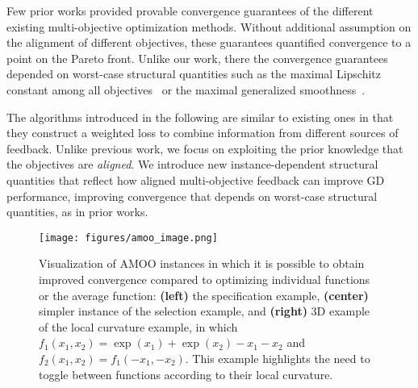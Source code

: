 Few prior works provided provable convergence guarantees of the different existing multi-objective optimization methods. Without additional assumption on the alignment of different objectives, these guarantees quantified convergence to a point on the Pareto front. Unlike our work, there the convergence guarantees depended on worst-case structural quantities such as the maximal Lipschitz constant among all objectives~\cite{liu2021conflict,navon2022multi} or the maximal generalized smoothness~\cite{zhang2024convergence}.


The algorithms introduced in the following are similar to existing ones in that they construct a weighted loss to combine information from different sources of feedback. Unlike previous work, we focus on exploiting the prior knowledge that the objectives are \emph{aligned}.  We introduce new instance-dependent structural quantities that reflect how aligned multi-objective feedback can improve GD performance, improving convergence that depends on worst-case structural quantities, as in prior works. 


\begin{figure*}[t]
    \centering
    \texttt{[image: figures/amoo\_image.png]}
    \caption{ Visualization of AMOO instances in which it is possible to obtain improved convergence compared to optimizing individual functions or the average function: \textbf{(left)} the specification example, \textbf{(center)} simpler instance of the selection example, and \textbf{(right)} 3D example of the local curvature example, in which $f_1(x_1,x_2)=\exp(x_1)+\exp(x_2)-x_1-x_2$ and $f_2(x_1,x_2)=f_1(-x_1,-x_2)$. This example highlights the need to toggle between functions according to their local curvature.}
    \label{fig:amoo_examples}
\end{figure*}



